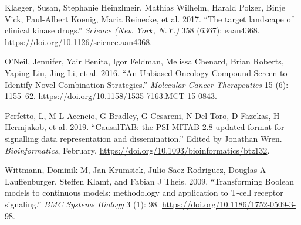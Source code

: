 \documentclass[12pt,]{book}
\begin{document}
\leavevmode\hypertarget{ref-Klaeger2017}{}%
Klaeger, Susan, Stephanie Heinzlmeir, Mathias Wilhelm, Harald Polzer, Binje Vick, Paul-Albert Koenig, Maria Reinecke, et al. 2017. ``The target landscape of clinical kinase drugs.'' \emph{Science (New York, N.Y.)} 358 (6367): eaan4368. \url{https://doi.org/10.1126/science.aan4368}.

\leavevmode\hypertarget{ref-ONeil2016}{}%
O'Neil, Jennifer, Yair Benita, Igor Feldman, Melissa Chenard, Brian Roberts, Yaping Liu, Jing Li, et al. 2016. ``An Unbiased Oncology Compound Screen to Identify Novel Combination Strategies.'' \emph{Molecular Cancer Therapeutics} 15 (6): 1155--62. \url{https://doi.org/10.1158/1535-7163.MCT-15-0843}.

\leavevmode\hypertarget{ref-Perfetto2019}{}%
Perfetto, L, M L Acencio, G Bradley, G Cesareni, N Del Toro, D Fazekas, H Hermjakob, et al. 2019. ``CausalTAB: the PSI-MITAB 2.8 updated format for signalling data representation and dissemination.'' Edited by Jonathan Wren. \emph{Bioinformatics}, February. \url{https://doi.org/10.1093/bioinformatics/btz132}.

\leavevmode\hypertarget{ref-Wittmann2009}{}%
Wittmann, Dominik M, Jan Krumsiek, Julio Saez-Rodriguez, Douglas A Lauffenburger, Steffen Klamt, and Fabian J Theis. 2009. ``Transforming Boolean models to continuous models: methodology and application to T-cell receptor signaling.'' \emph{BMC Systems Biology} 3 (1): 98. \url{https://doi.org/10.1186/1752-0509-3-98}.
\end{document}
